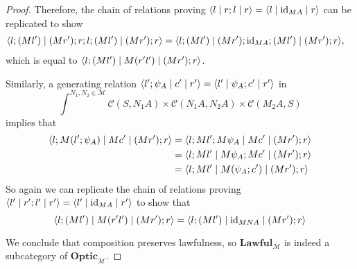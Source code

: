 \documentclass[11pt,a4paper]{article}
\theoremstyle{plain}
\theoremstyle{definition}
\newcommand{\C}{\mathscr{C}}
\newcommand{\M}{\mathscr{M}}
\newcommand{\Optic}{\mathbf{Optic}}
\newcommand{\Lawful}{\mathbf{Lawful}}
\newcommand{\id}{\mathrm{id}}
\newcommand{\repthree}[3]{{\ensuremath \langle #1 \mid #2 \mid #3 \rangle}}
\begin{document}
\begin{proof}
  Therefore, the chain of relations proving $\repthree{l}{r;l}{r } = \repthree{l}{\id_{MA}}{r }$ can be replicated to show
  \begin{align*}
    \repthree{l;(Ml')}{(Mr');r;l;(Ml')}{(Mr') ; r } &= \repthree{l;(Ml')}{(Mr');\id_{MA};(Ml')}{(Mr') ; r },
  \end{align*}
  which is equal to $\repthree{l;(Ml')}{M(r'l')}{(Mr') ; r }$.

  Similarly, a generating relation $\repthree{l';\psi_A}{c'}{r' } = \repthree{l'}{\psi_A ; c'}{r' }$ in \[\int^{N_1, N_2 \in \M} \C(S, N_1 A) \times \C(N_1 A, N_2 A) \times \C(M_2 A, S)\]
  implies that
  \begin{align*}
    \repthree{l;M(l';\psi_A)}{Mc'}{(Mr') ; r }
    &= \repthree{l;Ml';M\psi_A}{Mc'}{(Mr') ; r } \\
    &= \repthree{l;Ml'}{M\psi_A ; Mc'}{(Mr') ; r } \\
    &= \repthree{l;Ml'}{M(\psi_A;c')}{(Mr') ; r }
  \end{align*}
  So again we can replicate the chain of relations proving $\repthree{l'}{r';l'}{r' } = \repthree{l'}{\id_{MA}}{r' }$ to show that
  \[\repthree{l;(Ml')}{M(r'l')}{(Mr') ; r } = \repthree{l;(Ml')}{\id_{MNA}}{(Mr') ; r } \]

  We conclude that composition preserves lawfulness, so $\Lawful_\M$ is indeed a subcategory of $\Optic_\M$.
\end{proof}
\end{document}
